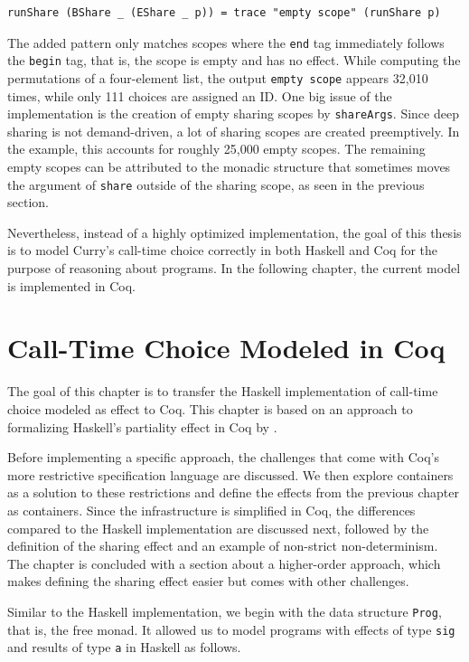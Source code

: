 \documentclass[a4paper, 11pt, fleqn, twoside, abstract=on]{scrreprt}
\newcommand{\hinl}[1]{\texttt{#1}}
\begin{document}
\begin{verbatim}
runShare (BShare _ (EShare _ p)) = trace "empty scope" (runShare p)
\end{verbatim}

The added pattern only matches scopes where the \hinl{end} tag immediately follows the \hinl{begin} tag, that is, the scope is empty and has no effect.
While computing the permutations of a four-element list, the output \hinl{empty scope} appears 32,010 times, while only 111 choices are assigned an ID.
One big issue of the implementation is the creation of empty sharing scopes by \hinl{shareArgs}.
Since deep sharing is not demand-driven, a lot of sharing scopes are created preemptively.
In the example, this accounts for roughly 25,000 empty scopes.
The remaining empty scopes can be attributed to the monadic structure that sometimes moves the argument of \hinl{share} outside of the sharing scope, as seen in the previous section.

Nevertheless, instead of a highly optimized implementation, the goal of this thesis is to model Curry's call-time choice correctly in both Haskell and Coq for the purpose of reasoning about programs.
In the following chapter, the current model is implemented in Coq.

\chapter{Call-Time Choice Modeled in Coq}
\label{ch:callTimeChoiceCoq}

The goal of this chapter is to transfer the Haskell implementation of call-time choice modeled as effect to Coq.
This chapter is based on an approach to formalizing Haskell's partiality effect in Coq by \citet{dylus2019oneMonad}.

Before implementing a specific approach, the challenges that come with Coq's more restrictive specification language are discussed.
We then explore containers as a solution to these restrictions and define the effects from the previous chapter as containers.
Since the infrastructure is simplified in Coq, the differences compared to the Haskell implementation are discussed next, followed by the definition of the sharing effect and an example of non-strict non-determinism.
The chapter is concluded with a section about a higher-order approach, which makes defining the sharing effect easier but comes with other challenges.

Similar to the Haskell implementation, we begin with the data structure \hinl{Prog}, that is, the free monad.
It allowed us to model programs with effects of type \hinl{sig} and results of type \hinl{a} in Haskell as follows.
\end{document}
